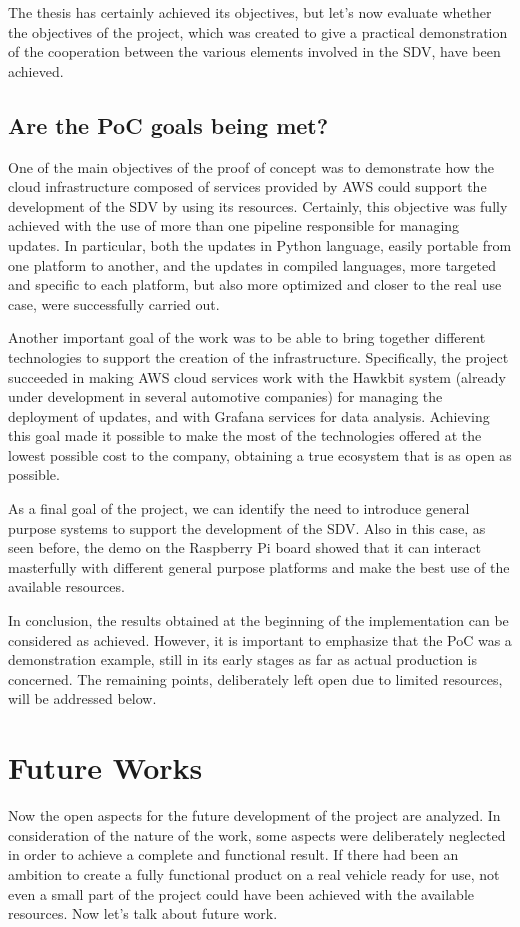 The thesis has certainly achieved its objectives, but let's now evaluate whether the objectives of the project, which was created to give a practical demonstration of the cooperation between the various elements involved in the SDV, have been achieved.

\subsection{Are the PoC goals being met?}
One of the main objectives of the proof of concept was to demonstrate how the cloud infrastructure composed of services provided by AWS could support the development of the SDV by using its resources. Certainly, this objective was fully achieved with the use of more than one pipeline responsible for managing updates. In particular, both the updates in Python language, easily portable from one platform to another, and the updates in compiled languages, more targeted and specific to each platform, but also more optimized and closer to the real use case, were successfully carried out.

Another important goal of the work was to be able to bring together different technologies to support the creation of the infrastructure. Specifically, the project succeeded in making AWS cloud services work with the Hawkbit system (already under development in several automotive companies) for managing the deployment of updates, and with Grafana services for data analysis. Achieving this goal made it possible to make the most of the technologies offered at the lowest possible cost to the company, obtaining a true ecosystem that is as open as possible.

As a final goal of the project, we can identify the need to introduce general purpose systems to support the development of the SDV. Also in this case, as seen before, the demo on the Raspberry Pi board showed that it can interact masterfully with different general purpose platforms and make the best use of the available resources.

In conclusion, the results obtained at the beginning of the implementation can be considered as achieved. However, it is important to emphasize that the PoC was a demonstration example, still in its early stages as far as actual production is concerned. The remaining points, deliberately left open due to limited resources, will be addressed below.

\section{Future Works}
Now the open aspects for the future development of the project are analyzed. In consideration of the nature of the work, some aspects were deliberately neglected in order to achieve a complete and functional result. If there had been an ambition to create a fully functional product on a real vehicle ready for use, not even a small part of the project could have been achieved with the available resources. Now let's talk about future work.

